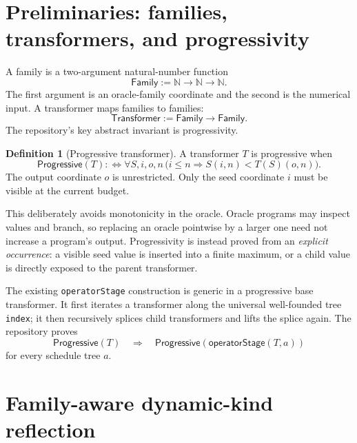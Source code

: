 \documentclass[11pt]{article}
\theoremstyle{definition}
\newtheorem{definition}[theorem]{Definition}
\newcommand{\Nat}{\ensuremath{\mathbb{N}}}
\newcommand{\Family}{\ensuremath{\mathsf{Family}}}
\newcommand{\Transformer}{\ensuremath{\mathsf{Transformer}}}
\newcommand{\Prog}{\ensuremath{\mathsf{Progressive}}}
\newcommand{\lean}[1]{\texttt{#1}}
\newcommand{\opstage}{\ensuremath{\mathsf{operatorStage}}}
\begin{document}
\section{Preliminaries: families, transformers, and progressivity}

A family is a two-argument natural-number function
\[
  \Family := \Nat \to \Nat \to \Nat.
\]
The first argument is an oracle-family coordinate and the second is the
numerical input.  A transformer maps families to families:
\[
  \Transformer := \Family \to \Family.
\]
The repository's key abstract invariant is progressivity.

\begin{definition}[Progressive transformer]
A transformer $T$ is progressive when
\[
  \Prog(T) :\Longleftrightarrow
  \forall S,i,o,n\,\bigl(i\le n \Rightarrow S(i,n)<T(S)(o,n)\bigr).
\]
The output coordinate $o$ is unrestricted.  Only the seed coordinate $i$ must
be visible at the current budget.
\end{definition}

This deliberately avoids monotonicity in the oracle.  Oracle programs may
inspect values and branch, so replacing an oracle pointwise by a larger one
need not increase a program's output.  Progressivity is instead proved from an
\emph{explicit occurrence}: a visible seed value is inserted into a finite
maximum, or a child value is directly exposed to the parent transformer.

The existing \lean{operatorStage} construction is generic in a progressive
base transformer.  It first iterates a transformer along the universal
well-founded tree \lean{index}; it then recursively splices child transformers
and lifts the splice again.  The repository proves
\begin{equation}
  \Prog(T) \quad\Longrightarrow\quad
  \Prog(\opstage(T,a))
  \label{eq:operator-progressive}
\end{equation}
for every schedule tree $a$.

\section{Family-aware dynamic-kind reflection}
\end{document}
